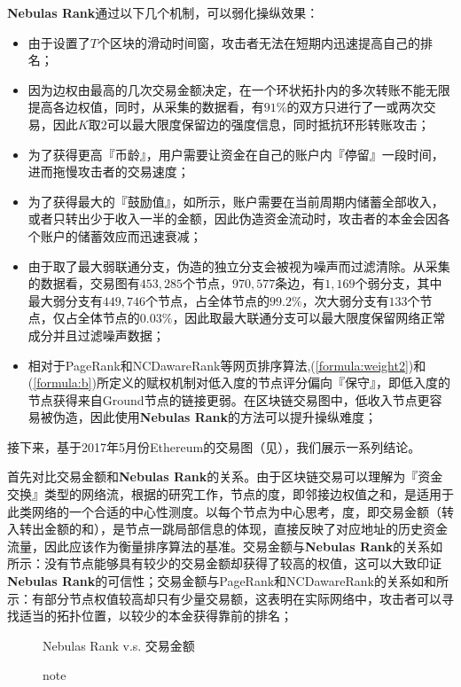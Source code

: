 \textbf{Nebulas Rank}通过以下几个机制，可以弱化操纵效果：
\begin{itemize}
	\item 由于设置了$T$个区块的滑动时间窗，攻击者无法在短期内迅速提高自己的排名；
	\item 因为边权由最高的几次交易金额决定，在一个环状拓扑内的多次转账不能无限提高各边权值，同时，从采集的数据看，有$91\%$的双方只进行了一或两次交易，因此$K$取$2$可以最大限度保留边的强度信息，同时抵抗环形转账攻击；
	\item 为了获得更高『币龄』，用户需要让资金在自己的账户内『停留』一段时间，进而拖慢攻击者的交易速度；
	\item 为了获得最大的『鼓励值』，如所示，账户需要在当前周期内储蓄全部收入，或者只转出少于收入一半的金额，因此伪造资金流动时，攻击者的本金会因各个账户的储蓄效应而迅速衰减；
	\item 由于取了最大弱联通分支，伪造的独立分支会被视为噪声而过滤清除。从采集的数据看，交易图有$453,285$个节点，$970,577$条边，有$1,169$个弱分支，其中最大弱分支有$449,746$个节点，占全体节点的$99.2\%$，次大弱分支有$133$个节点，仅占全体节点的$0.03\%$，因此取最大联通分支可以最大限度保留网络正常成分并且过滤噪声数据；
	\item 相对于PageRank和NCDawareRank\cite{Nikolakopoulos2013}等网页排序算法,(\ref{formula:weight2})和(\ref{formula:b})所定义的赋权机制对低入度的节点评分偏向『保守』，即低入度的节点获得来自Ground节点的链接更弱。在区块链交易图中，低收入节点更容易被伪造，因此使用\textbf{Nebulas Rank}的方法可以提升操纵难度；
\end{itemize}

接下来，基于2017年5月份Ethereum的交易图（见），我们展示一系列结论。

首先对比交易金额和\textbf{Nebulas Rank}的关系。由于区块链交易可以理解为『资金交换』类型的网络流，根据\textcite{Borgatti2005}的研究工作，节点的度，即邻接边权值之和，是适用于此类网络的一个合适的中心性测度。以每个节点为中心思考，度，即交易金额（转入转出金额的和），是节点一跳局部信息的体现，直接反映了对应地址的历史资金流量，因此应该作为衡量排序算法的基准。交易金额与\textbf{Nebulas Rank}的关系如所示：没有节点能够具有较少的交易金额却获得了较高的权值，这可以大致印证\textbf{Nebulas Rank}的可信性；交易金额与PageRank和NCDawareRank的关系如和所示：有部分节点权值较高却只有少量交易额，这表明在实际网络中，攻击者可以寻找适当的拓扑位置，以较少的本金获得靠前的排名；

\begin{figure}
	\centering
	\caption{Nebulas Rank v.s. 交易金额}\label{fig:nrio}
	\caption*{note}
\end{figure}

